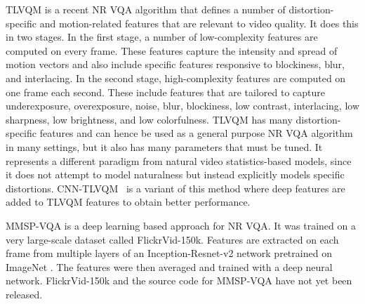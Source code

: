 \documentclass[journal]{IEEEtran}
\begin{document}
TLVQM \cite{tlvqm} is a recent NR VQA algorithm that defines a number of distortion-specific and motion-related features that are relevant to video quality. It does this in two stages. In the first stage, a number of low-complexity features are computed on every frame. These features capture the intensity and spread of motion vectors and also include specific features responsive to blockiness, blur, and interlacing.  In the second stage, high-complexity features are computed on one frame each second. These include features that are tailored to capture underexposure, overexposure, noise, blur, blockiness, low contrast, interlacing, low sharpness, low brightness, and low colorfulness.  TLVQM has many distortion-specific features and can hence be used as a general purpose NR VQA algorithm in many settings, but it also has many parameters that must be tuned. It represents a different paradigm from natural video statistics-based models, since it does not attempt to model naturalness but instead explicitly models specific distortions. CNN-TLVQM~\cite{cnntlvqm} is a variant of this method where deep features are added to TLVQM features to obtain better performance.

MMSP-VQA \cite{mmspvqa} is a deep learning based approach for NR VQA. It was trained on a very large-scale dataset called FlickrVid-150k. Features are extracted on each frame from multiple layers of an Inception-Resnet-v2 \cite{resnet} network pretrained on ImageNet \cite{imagenet}. The features were then averaged and trained with a deep neural network. FlickrVid-150k and the source code for MMSP-VQA have not yet been released. 
\end{document}

